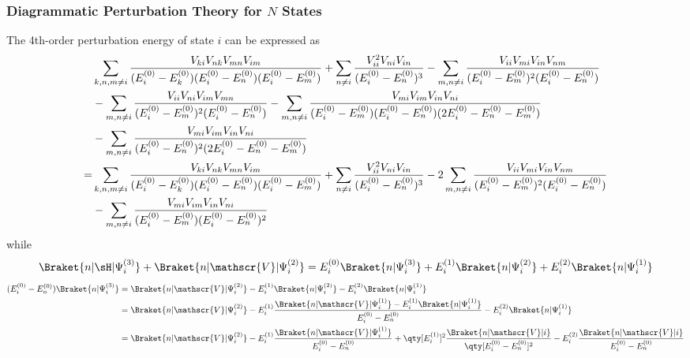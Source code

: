\documentclass[a4paper]{article}
\begin{document}
\subsubsection{Diagrammatic Perturbation Theory for $ N $ States}
The 4th-order perturbation energy of state $ i $ can be expressed as
\begin{align}
&\sum_{k,n,m\neq i} \dfrac{V_{ki}V_{nk}V_{mn}V_{im}}{(E_i^{(0)}-E_k^{(0)})(E_i^{(0)}-E_n^{(0)})(E_i^{(0)}-E_m^{(0)})} + \sum_{n\neq i} \dfrac{V_{ii}^2 V_{ni}V_{in}}{(E_i^{(0)}-E_n^{(0)})^3} - \sum_{m,n\neq i} \dfrac{V_{ii}V_{mi}V_{in}V_{nm}}{(E_i^{(0)}-E_m^{(0)})^2(E_i^{(0)}-E_n^{(0)})} \notag\\
&- \sum_{m,n\neq i} \dfrac{V_{ii}V_{ni}V_{im}V_{mn}}{(E_i^{(0)}-E_m^{(0)})^2(E_i^{(0)}-E_n^{(0)})} - \sum_{m,n\neq i} \dfrac{V_{mi}V_{im}V_{in}V_{ni}}{(E_i^{(0)}-E_m^{(0)})(E_i^{(0)}-E_n^{(0)})(2E_i^{(0)}-E_n^{(0)}-E_m^{(0)})} \notag\\
&- \sum_{m,n\neq i} \dfrac{V_{mi}V_{im}V_{in}V_{ni}}{(E_i^{(0)}-E_n^{(0)})^2(2E_i^{(0)}-E_n^{(0)}-E_m^{(0)})} \notag\\
= &\sum_{k,n,m\neq i} \dfrac{V_{ki}V_{nk}V_{mn}V_{im}}{(E_i^{(0)}-E_k^{(0)})(E_i^{(0)}-E_n^{(0)})(E_i^{(0)}-E_m^{(0)})} + \sum_{n\neq i} \dfrac{V_{ii}^2 V_{ni}V_{in}}{(E_i^{(0)}-E_n^{(0)})^3} - 2\sum_{m,n\neq i} \dfrac{V_{ii}V_{mi}V_{in}V_{nm}}{(E_i^{(0)}-E_m^{(0)})^2(E_i^{(0)}-E_n^{(0)})} \notag\\
&%
- \sum_{m,n\neq i} \dfrac{V_{mi}V_{im}V_{in}V_{ni}}{(E_i^{(0)}-E_m^{(0)})(E_i^{(0)}-E_n^{(0)})^2} 
\end{align}
while
\begin{equation}\label{key}
\Braket{n | \sH | \Psi_i^{(3)}} + \Braket{n | \mathscr{V} | \Psi_i^{(2)}} = E_i^{(0)} \Braket{n|\Psi_i^{(3)}} + E_i^{(1)} \Braket{n|\Psi_i^{(2)}} + E_i^{(2)} \Braket{n|\Psi_i^{(1)}}
\end{equation}
\begin{align}\label{key}
(E_i^{(0)} - E_n^{(0)})\Braket{n | \Psi_i^{(3)}} 
&= \Braket{n | \mathscr{V} | \Psi_i^{(2)}} - E_i^{(1)} \Braket{n|\Psi_i^{(2)}} - E_i^{(2)} \Braket{n|\Psi_i^{(1)}} \notag\\
&= \Braket{n | \mathscr{V} | \Psi_i^{(2)}} 
- E_i^{(1)} \dfrac{\Braket{n | \mathscr{V} | \Psi_i^{(1)}} - E_i^{(1)}\Braket{n|\Psi_i^{(1)}}}{E_i^{(0)} - E_n^{(0)}} 
- E_i^{(2)} \Braket{n|\Psi_i^{(1)}} \notag\\
&= \Braket{n | \mathscr{V} | \Psi_i^{(2)}} 
- E_i^{(1)} \dfrac{\Braket{n | \mathscr{V} | \Psi_i^{(1)}}}{E_i^{(0)} - E_n^{(0)}} 
+ \qty[E_i^{(1)}]^2 \dfrac{\Braket{n|\mathscr{V}|i}}{\qty[E_i^{(0)} - E_n^{(0)}]^2} 
- E_i^{(2)} \dfrac{\Braket{n|\mathscr{V}|i}}{E_i^{(0)} - E_n^{(0)}} 
\end{align}
\end{document}

